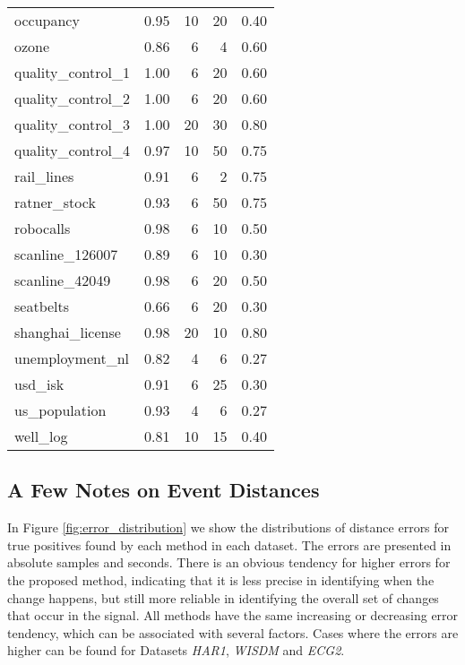 \begin{table}[h]
\begin{tabular}{lrrrr}
    occupancy &  0.95 &   10 &   20 &  0.40 \\
    ozone &  0.86 &    6 &    4 &  0.60 \\
    quality\_control\_1 &  1.00 &    6 &   20 &  0.60 \\
    quality\_control\_2 &  1.00 &    6 &   20 &  0.60 \\
    quality\_control\_3 &  1.00 &   20 &   30 &  0.80 \\
    quality\_control\_4 &  0.97 &   10 &   50 &  0.75 \\
    rail\_lines &  0.91 &    6 &    2 &  0.75 \\
    ratner\_stock &  0.93 &    6 &   50 &  0.75 \\
    robocalls &  0.98 &    6 &   10 &  0.50 \\
    scanline\_126007 &  0.89 &    6 &   10 &  0.30 \\
    scanline\_42049 &  0.98 &    6 &   20 &  0.50 \\
    seatbelts &  0.66 &    6 &   20 &  0.30 \\
    shanghai\_license &  0.98 &   20 &   10 &  0.80 \\
    unemployment\_nl &  0.82 &    4 &    6 &  0.27 \\
    usd\_isk &  0.91 &    6 &   25 &  0.30 \\
    us\_population &  0.93 &    4 &    6 &  0.27 \\
    well\_log &  0.81 &   10 &   15 &  0.40 \\
    \bottomrule
    \end{tabular}
\end{table}

\subsection{A Few Notes on Event Distances}
\label{sec:distances}

In Figure \ref{fig:error_distribution} we show the distributions of distance errors for true positives  found by each method in each dataset. The errors are presented in absolute samples and seconds. There is an obvious tendency for higher errors for the proposed method, indicating that it is less precise in identifying when the change happens, but still more reliable in identifying the overall set of changes that occur in the signal. All methods have the same increasing or decreasing error tendency, which can be associated with several factors. Cases where the errors are higher can be found for Datasets \textit{HAR1}, \textit{WISDM} and \textit{ECG2}. 
 
